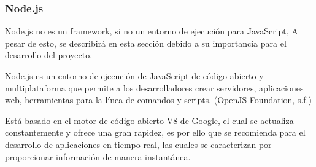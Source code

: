 \subsubsection{Node.js}
Node.js no es un framework, si no un entorno de ejecución para JavaScript, A pesar de esto, se describirá en esta sección debido a su importancia para el desarrollo del proyecto.

Node.js es un entorno de ejecución de JavaScript de código abierto y multiplataforma que permite a los desarrolladores crear servidores, aplicaciones web, herramientas para la línea de comandos y scripts. (OpenJS Foundation, s.f.)

Está basado en el motor de código abierto V8 de Google, el cual se actualiza constantemente y ofrece una gran rapidez, es por ello que se recomienda para el desarrollo de aplicaciones en tiempo real, las cuales se caracterizan por proporcionar información de manera instantánea.